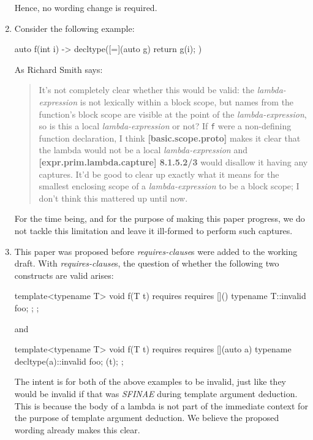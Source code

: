 \documentclass{wg21}
\newcommand{\cc}[1]{\texttt{#1}}
\begin{document}
\begin{enumerate}
    Hence, no wording change is required.

  \item \label{discussion.blockscope}
    Consider the following example:

\begin{cpp}
auto f(int i) -> decltype([=](auto g) { return g(i); }) { }
\end{cpp}

    As Richard Smith says:
    \begin{quote}
      It's not completely clear whether this would be valid: the
      \textit{lambda-expression} is not lexically within a block scope,
      but names from the function's block scope are visible at the point of
      the \textit{lambda-expression}, so is this a local \textit{lambda-expression}
      or not? If \cc{f} were a non-defining function declaration, I think
      \textbf{[basic.scope.proto]} makes it clear that the lambda would not
      be a local \textit{lambda-expression} and \textbf{[expr.prim.lambda.capture] 8.1.5.2/3}
      would disallow it having any captures. It'd be good to clear up exactly
      what it means for the smallest enclosing scope of a \textit{lambda-expression}
      to be a block scope; I don't think this mattered up until now.
    \end{quote}

    For the time being, and for the purpose of making this paper progress, we
    do not tackle this limitation and leave it ill-formed to perform such
    captures.

  \item This paper was proposed before \textit{requires-clause}s were added to
        the working draft. With \textit{requires-clause}s, the question of
        whether the following two constructs are valid arises:

        \begin{cpp}
          template<typename T>
          void f(T t) requires requires {
            []() { typename T::invalid foo; };
          };
        \end{cpp}

        and

        \begin{cpp}
          template<typename T>
          void f(T t) requires requires {
            [](auto a) { typename decltype(a)::invalid foo; }(t);
          };
        \end{cpp}

        The intent is for both of the above examples to be invalid, just like
        they would be invalid if that was \textit{SFINAE} during template
        argument deduction. This is because the body of a lambda is not part
        of the immediate context for the purpose of template argument deduction.
        We believe the proposed wording already makes this clear.
\end{enumerate}
\end{document}
